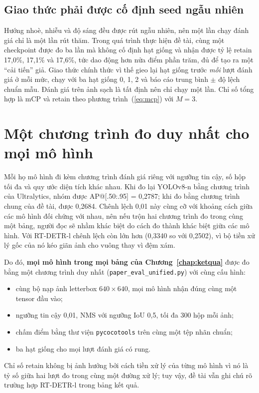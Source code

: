 \subsection{Giao thức phải được cố định seed ngẫu nhiên}

Hướng nhoè, nhiễu và độ sáng đều được rút ngẫu nhiên, nên một lần chạy đánh giá chỉ là một lần rút thăm. Trong quá trình thực hiện đề tài, cùng một checkpoint được đo ba lần mà không cố định hạt giống và nhận được tỷ lệ retain 17,0\%, 17,1\% và 17,6\%, tức dao động hơn nửa điểm phần trăm, đủ để tạo ra một ``cải tiến'' giả. Giao thức chính thức vì thế gieo lại hạt giống trước \textit{mỗi} lượt đánh giá ở mỗi mức, chạy với ba hạt giống 0, 1, 2 và báo cáo trung bình $\pm$ độ lệch chuẩn mẫu. Đánh giá trên ảnh sạch là tất định nên chỉ chạy một lần. Chỉ số tổng hợp là mCP và retain theo phương trình~(\ref{eq:mcp}) với $M=3$.

\section{Một chương trình đo duy nhất cho mọi mô hình}
\label{sec:mottrinhdo}

Mỗi họ mô hình đi kèm chương trình đánh giá riêng với ngưỡng tin cậy, số hộp tối đa và quy ước diện tích khác nhau. Khi đo lại YOLOv8-n bằng chương trình của Ultralytics, nhóm được AP@[.50:.95] = 0,2787; khi đo bằng chương trình chung của đề tài, được 0,2684. Chênh lệch 0,01 này cùng cỡ với khoảng cách giữa các mô hình đối chứng với nhau, nên nếu trộn hai chương trình đo trong cùng một bảng, người đọc sẽ nhầm khác biệt do cách đo thành khác biệt giữa các mô hình. Với RT-DETR-l chênh lệch còn lớn hơn (0,3340 so với 0,2502), vì bộ tiền xử lý gốc của nó kéo giãn ảnh cho vuông thay vì đệm xám.

Do đó, \textbf{mọi mô hình trong mọi bảng của Chương~\ref{chap:ketqua}} được đo bằng một chương trình duy nhất (\texttt{paper\_eval\_unified.py}) với cùng cấu hình:
\begin{itemize}
\item cùng bộ nạp ảnh letterbox $640\times640$, mọi mô hình nhận đúng cùng một tensor đầu vào;
\item ngưỡng tin cậy 0,01, NMS với ngưỡng IoU 0,5, tối đa 300 hộp mỗi ảnh;
\item chấm điểm bằng thư viện \texttt{pycocotools} trên cùng một tệp nhãn chuẩn;
\item ba hạt giống cho mọi lượt đánh giá có rung.
\end{itemize}
Chỉ số retain không bị ảnh hưởng bởi cách tiền xử lý của từng mô hình vì nó là tỷ số giữa hai lượt đo trong cùng một đường xử lý; tuy vậy, đề tài vẫn ghi chú rõ trường hợp RT-DETR-l trong bảng kết quả.

